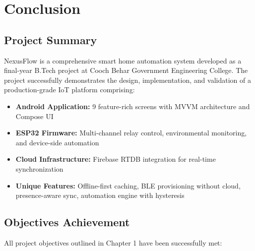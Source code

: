 \chapter{Conclusion}

\section{Project Summary}

NexusFlow is a comprehensive smart home automation system developed as a final-year B.Tech project at Cooch Behar Government Engineering College. The project successfully demonstrates the design, implementation, and validation of a production-grade IoT platform comprising:

\begin{itemize}
    \item \textbf{Android Application:} 9 feature-rich screens with MVVM architecture and Compose UI
    \item \textbf{ESP32 Firmware:} Multi-channel relay control, environmental monitoring, and device-side automation
    \item \textbf{Cloud Infrastructure:} Firebase RTDB integration for real-time synchronization
    \item \textbf{Unique Features:} Offline-first caching, BLE provisioning without cloud, presence-aware sync, automation engine with hysteresis
\end{itemize}

\section{Objectives Achievement}

All project objectives outlined in Chapter 1 have been successfully met:

